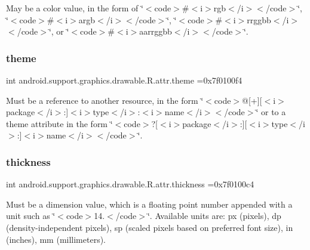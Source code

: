 May be a color value, in the form of \char`\"{}$<$code$>$\#$<$i$>$rgb$<$/i$>$$<$/code$>$\char`\"{}, \char`\"{}$<$code$>$\#$<$i$>$argb$<$/i$>$$<$/code$>$\char`\"{}, \char`\"{}$<$code$>$\#$<$i$>$rrggbb$<$/i$>$$<$/code$>$\char`\"{}, or \char`\"{}$<$code$>$\#$<$i$>$aarrggbb$<$/i$>$$<$/code$>$\char`\"{}. \mbox{\label{classandroid_1_1support_1_1graphics_1_1drawable_1_1R_1_1attr_af545d01b3d7325084759b9d27f242644}} 
\subsubsection{\texorpdfstring{theme}{theme}}
{\footnotesize\ttfamily int android.\+support.\+graphics.\+drawable.\+R.\+attr.\+theme =0x7f0100f4\hspace{0.3cm}{\ttfamily [static]}}

Must be a reference to another resource, in the form \char`\"{}$<$code$>$@\mbox{[}+\mbox{]}\mbox{[}$<$i$>$package$<$/i$>$\+:\mbox{]}$<$i$>$type$<$/i$>$\+:$<$i$>$name$<$/i$>$$<$/code$>$\char`\"{} or to a theme attribute in the form \char`\"{}$<$code$>$?\mbox{[}$<$i$>$package$<$/i$>$\+:\mbox{]}\mbox{[}$<$i$>$type$<$/i$>$\+:\mbox{]}$<$i$>$name$<$/i$>$$<$/code$>$\char`\"{}. \mbox{\label{classandroid_1_1support_1_1graphics_1_1drawable_1_1R_1_1attr_a5eb044d76e2e151b982a6a1d4bb6aa3f}} 
\subsubsection{\texorpdfstring{thickness}{thickness}}
{\footnotesize\ttfamily int android.\+support.\+graphics.\+drawable.\+R.\+attr.\+thickness =0x7f0100c4\hspace{0.3cm}{\ttfamily [static]}}

Must be a dimension value, which is a floating point number appended with a unit such as \char`\"{}$<$code$>$14.\+5sp$<$/code$>$\char`\"{}. Available units are\+: px (pixels), dp (density-\/independent pixels), sp (scaled pixels based on preferred font size), in (inches), mm (millimeters). 

